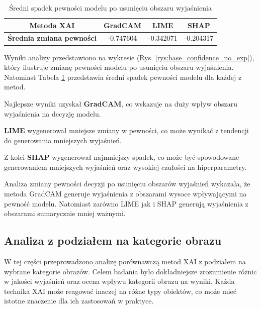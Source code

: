 \begin{table}[h]
	\centering
	\begin{tabular}{|c|c|c|c|}
		\hline
		\textbf{Metoda XAI}              & \textbf{GradCAM} & \textbf{LIME} & \textbf{SHAP} \\
		\hline
		\textbf{Średnia zmiana pewności} & -0.747604        & -0.342071     & -0.204317     \\
		\hline
	\end{tabular}
	\caption{Średni spadek pewności modelu po usunięciu obszaru wyjaśnienia}
	\label{tab:base_confidence_no_exp}
\end{table}

Wyniki analizy przedstawiono na wykresie (Rys. \ref{rys:base_confidence_no_exp}), który ilustruje zmianę pewności modelu po usunięciu obszaru wyjaśnienia.
Natomiast Tabela \ref{tab:base_confidence_no_exp} przedstawia średni spadek pewności modelu dla każdej z metod.

Najlepsze wyniki uzyskał \textbf{GradCAM}, co wskazuje na duży wpływ obszaru wyjaśnienia na decyzję modelu.

\textbf{LIME} wygenerował mniejsze zmiany w pewności, co może wynikać z tendencji do generowania mniejszych wyjaśnień.

Z kolei \textbf{SHAP} wygenerował najmniejszy spadek, co może być spowodowane generowaniem mniejszych wyjaśnień oraz wysokiej czułości na hiperparametry.

Analiza zmiany pewności decyzji po usunięciu obszarów wyjaśnień wykazała, że metoda GradCAM generuje wyjaśnienia z obszarami wysoce wpływającymi na pewność modelu.
Natomiast zarówno LIME jak i SHAP generują wyjaśnienia z obszarami sumarycznie mniej ważnymi.

\subsection*{Analiza z podziałem na kategorie obrazu}

W tej części przeprowadzono analizę porównawczą metod XAI z podziałem na wybrane kategorie obrazów.
Celem badania było dokładniejsze zrozumienie różnic w jakości wyjaśnień oraz ocena wpływu kategorii obrazu na wyniki.
Każda technika XAI może reagować inaczej na różne typy obiektów, co może mieć istotne znaczenie dla ich zastosowań w praktyce.


